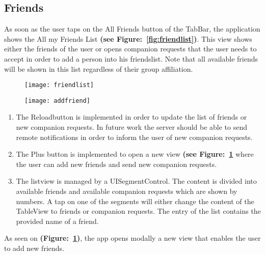 \subsection{Friends}

As soon as the user taps on the All Friends button of the TabBar, the application shows the All my Friends List \textbf{(see Figure:~\ref{fig:friendlist})}. This view shows either the friends of the user or opens companion requests that the user needs to accept in order to add a person into his friendslist. Note that all available friends will be shown in this list regardless of their group affiliation.

\begin{figure}
\centering
\begin{minipage}{.5\textwidth}
  \centering
  \texttt{[image: friendlist]}
  \label{fig:friendlist}
\end{minipage}%
\begin{minipage}{.5\textwidth}
  \centering
  \texttt{[image: addfriend]}
  \label{fig:addfriend}
\end{minipage}
\end{figure}

\begin{enumerate}
\item The Reloadbutton is implemented in order to update the list of friends or new companion requests. In future work the server should be able to send remote notifications in order to inform the user of new companion requests.

\item The Plus button is implemented to open a new view \textbf{(see Figure:~\ref{fig:addfriend}} where the user can add new friends and send new companion requests.

\item The listview is managed by a UISegmentControl. The content is divided into available friends and available companion requests which are shown by numbers. A tap on one of the segments will either change the content of the TableView to friends or companion requests. The entry of the list contains the provided name of a friend.
\end{enumerate}


As seen on \textbf{(Figure:~\ref{fig:addfriend})}, the app opens modally a new view that enables the user to add new friends.


